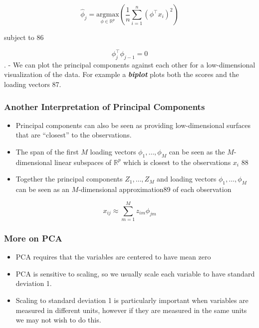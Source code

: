 \documentclass[11pt]{article}
\providecommand{\tightlist}{%
      \setlength{\itemsep}{0pt}\setlength{\parskip}{0pt}}
\begin{document}
\[ \hat{\phi}_j = \underset{\phi \in \mathbb{R}^p}{\text{argmax}}\left(\frac{1}{n}\sum_{i=1}^n \left(\phi^\top x_i\right)^2\right)\]

subject to 86

\[\phi_j^\top \phi_{j - 1} = 0\]. - We can plot the principal components
against each other for a low-dimensional visualization of the data. For
example a \textbf{\emph{biplot}} plots both the scores and the loading
vectors 87.

    \hypertarget{another-interpretation-of-principal-components}{%
\subsubsection{Another Interpretation of Principal
Components}\label{another-interpretation-of-principal-components}}

    \begin{itemize}
\tightlist
\item
  Principal components can also be seen as providing low-dimensional
  surfaces that are ``closest'' to the observations.
\item
  The span of the first \(M\) loading vectors \(\phi_1, \dots, \phi_M\)
  can be seen as the \(M\)-dimensional linear subspaces of
  \(\mathbb{R}^p\) which is closest to the observations \(x_i\) 88
\item
  Together the principal components \(Z_1, \dots, Z_M\) and loading
  vectors \(\phi_1, \dots, \phi_M\) can be seen as an \(M\)-dimensional
  approximation89 of each observation
\end{itemize}

\[x_{ij} \approx \sum_{m = 1}^M z_{im}\phi_{jm}\]

    \hypertarget{more-on-pca}{%
\subsubsection{More on PCA}\label{more-on-pca}}

    \begin{itemize}
\tightlist
\item
  PCA requires that the variables are centered to have mean zero
\item
  PCA is sensitive to scaling, so we usually scale each variable to have
  standard deviation 1.
\item
  Scaling to standard deviation 1 is particularly important when
  variables are measured in different units, however if they are
  measured in the same units we may not wish to do this.
\end{itemize}
\end{document}

